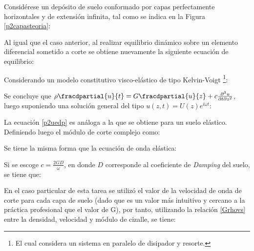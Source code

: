 Considérese un depósito de suelo conformado por capas perfectamente horizontales y de extensión infinita, tal como se indica en la Figura \ref{p2capasteoria}:


Al igual que el caso anterior, al realizar equilibrio dinámico sobre un elemento diferencial sometido a corte se obtiene nuevamente la siguiente ecuación de equilibrio:


Considerando un modelo constitutivo visco-elástico de tipo Kelvin-Voigt \footnote{El cual considera un sistema en paralelo de disipador y resorte.}:


Se concluye que $\rho \fracdpartial{u}{t} = G \fracdpartial{u}{z} + c \frac{\partial^3 u}{\partial t \partial z^2}$, luego suponiendo una solución general del tipo $u(z,t)=U(z)e^{i\omega t}$:



La ecuación \eqref{p2uedp} es análoga a la que se obtiene para un suelo elástico. Definiendo luego el módulo de corte complejo como:


Se tiene la misma forma que la ecuación de onda elástica:


Si se escoge $c = \frac{2GD}{\omega}$, en donde $D$ corresponde al coeficiente de \textit{Damping} del suelo, se tiene que:


En el caso particular de esta tarea se utilizó el valor de la velocidad de onda de corte para cada capa de suelo (dado que es un valor más intuitivo y cercano a la práctica profesional que el valor de G), por tanto, utilizando la relación \eqref{Grhovs} entre la densidad, velocidad y módulo de cizalle, se tiene:

